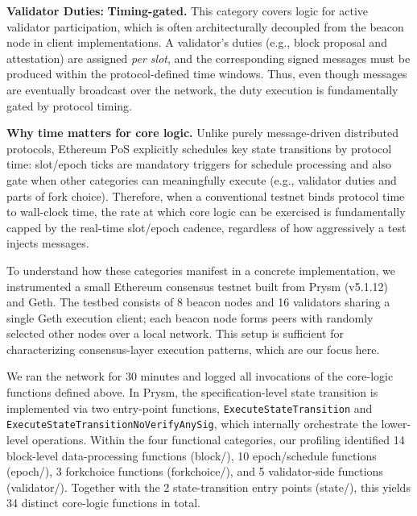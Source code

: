 \smallskip
\noindent\textbf{ Validator Duties:} \textbf{Timing-gated.} This category covers logic for active validator participation, which is often architecturally decoupled from the beacon node in client implementations. A validator's duties (e.g., block proposal and attestation) are assigned \emph{per slot}, and the corresponding signed messages must be produced within the protocol-defined time windows. Thus, even though messages are eventually broadcast over the network, the duty execution is fundamentally gated by protocol timing.

\smallskip
\noindent\textbf{Why time matters for core logic.}
Unlike purely message-driven distributed protocols, Ethereum PoS explicitly schedules key state transitions by protocol time: slot/epoch ticks are mandatory triggers for schedule processing and also gate when other categories can meaningfully execute (e.g., validator duties and parts of fork choice). Therefore, when a conventional testnet binds protocol time to wall-clock time, the rate at which core logic can be exercised is fundamentally capped by the real-time slot/epoch cadence, regardless of how aggressively a test injects messages.

\smallskip
To understand how these categories manifest in a concrete implementation, we instrumented a small Ethereum consensus testnet built from Prysm (v5.1.12)~\cite{prysm} and Geth. The testbed consists of 8 beacon nodes and 16 validators sharing a single Geth execution client; each beacon node forms peers with randomly selected other nodes over a local network. This setup is sufficient for characterizing consensus-layer execution patterns, which are our focus here.

We ran the network for 30 minutes and logged all invocations of the core-logic functions defined above. In Prysm, the specification-level state transition is implemented via two entry-point functions, \texttt{ExecuteStateTransition} and \texttt{ExecuteStateTransitionNoVerifyAnySig}, which internally orchestrate the lower-level operations. Within the four functional categories, our profiling identified 14 block-level data-processing functions (block/), 10 epoch/schedule functions (epoch/), 3 forkchoice functions (forkchoice/), and 5 validator-side functions (validator/). Together with the 2 state-transition entry points (state/), this yields 34 distinct core-logic functions in total.


